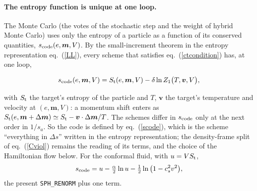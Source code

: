 \documentclass[11pt,aps,preprint,nofootinbib,superscriptaddress,tightenlines]{revtex4-2}
\def\st{\begin{equation}}
\def\stp{\end{equation}}
\def\Eq#1{eq.~(\ref{#1})}
\let\oldparagraph\paragraph
\renewcommand{\paragraph}{\par\bigskip\oldparagraph}
\begin{document}
\paragraph{The entropy function is unique at one loop.}  The Monte Carlo (the votes of the stochastic step and the weight of hybrid Monte Carlo) uses only the entropy of a
particle as a function of its conserved quantities, $s_{\rm code}(e,\bm m,V)$.  By the small-increment theorem in the entropy representation \Eq{LL}, every scheme that
satisfies \Eq{ctcondition} has, at one loop,
\begin{keyeq}
\st
s_{\rm code}(e,\bm m,V)=S_{\rm t}(e,\bm m,V)-\delta\ln Z_1\big(T,\bm v,V\big) ,
\label{scode}
\stp
\end{keyeq}
with $S_{\rm t}$ the target's entropy of the particle and $T$, $\bm v$ the target's temperature and velocity at $(e,\bm m,V)$: a momentum shift enters as
$S_{\rm t}(e,\bm m+\Delta\bm m)\simeq S_{\rm t}-\bm v\cdot\Delta\bm m/T$.  The schemes differ in $s_{\rm code}$ only at the next order in $1/s_a$.  So the code is defined by
\Eq{scode}, which is the scheme ``everything in $\Delta s$'' written in the entropy representation; the density-frame split of \Eq{Cviol} remains the reading of its terms,
and the choice of the Hamiltonian flow below.  For the conformal fluid, with $u=VS_{\rm t}$,
\st
s_{\rm code}=u-\tfrac\alpha2\ln u-\tfrac12\ln\big(1-c_s^2v^2\big) ,
\stp
the present \texttt{SPH\_RENORM} plus one term.
\end{document}
